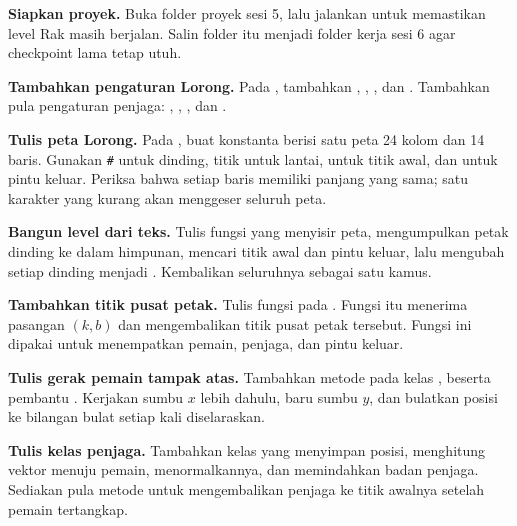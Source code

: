 \begin{langkah}
  \item \textbf{Siapkan proyek.} Buka folder proyek sesi 5, lalu jalankan
         untuk memastikan level Rak masih berjalan.
        Salin folder itu menjadi folder kerja sesi 6 agar checkpoint lama tetap
        utuh.

  \item \textbf{Tambahkan pengaturan Lorong.} Pada , tambahkan
        , , ,
        dan . Tambahkan pula pengaturan penjaga:
        , ,
        , dan .

  \item \textbf{Tulis peta Lorong.} Pada , buat konstanta
         berisi satu peta 24 kolom dan 14 baris. Gunakan
        \texttt{\#} untuk dinding, titik untuk lantai,  untuk titik awal,
        dan  untuk pintu keluar. Periksa bahwa setiap baris memiliki
        panjang yang sama; satu karakter yang kurang akan menggeser seluruh
        peta.

  \item \textbf{Bangun level dari teks.} Tulis fungsi  yang
        menyisir peta, mengumpulkan petak dinding ke dalam himpunan, mencari
        titik awal dan pintu keluar, lalu mengubah setiap dinding menjadi
        . Kembalikan seluruhnya sebagai satu kamus.

  \item \textbf{Tambahkan titik pusat petak.} Tulis fungsi 
        pada . Fungsi itu menerima pasangan $(k, b)$ dan
        mengembalikan  titik pusat petak tersebut. Fungsi
        ini dipakai untuk menempatkan pemain, penjaga, dan pintu keluar.

  \item \textbf{Tulis gerak pemain tampak atas.} Tambahkan metode
         pada kelas , beserta pembantu
        . Kerjakan sumbu $x$ lebih dahulu, baru
        sumbu $y$, dan bulatkan posisi ke bilangan bulat setiap kali
         diselaraskan.

  \item \textbf{Tulis kelas penjaga.} Tambahkan kelas  yang
        menyimpan posisi, menghitung vektor menuju pemain, menormalkannya, dan
        memindahkan badan penjaga. Sediakan pula metode  untuk
        mengembalikan penjaga ke titik awalnya setelah pemain tertangkap.


\end{langkah}
